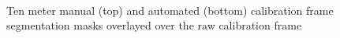 \begin{figure}[htbp]
    \centering
    \\[1mm]
    \caption{Ten meter manual (top) and automated (bottom) calibration frame segmentation masks overlayed over
    the raw calibration frame}
    \label{fig:10m_mask_overlays}
\end{figure}